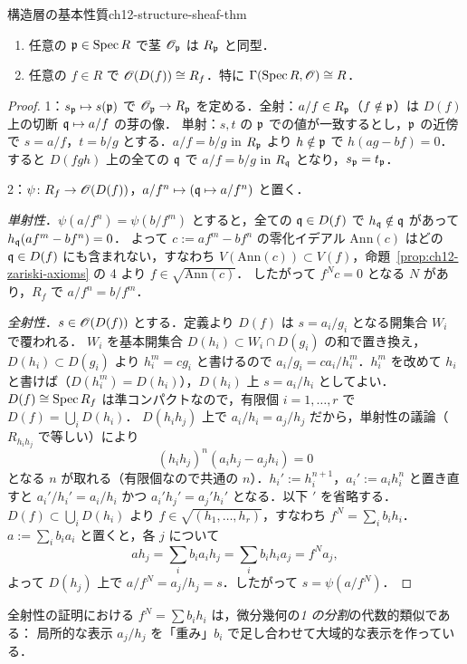 \begin{mythm}{構造層の基本性質}{ch12-structure-sheaf-thm}
\begin{enumerate}
  \item 任意の $\mathfrak{p}\in\operatorname{Spec} R$ で茎 $\mathscr{O}_{\mathfrak{p}}$ は $R_{\mathfrak{p}}$ と同型．
  \item 任意の $f\in R$ で $\mathscr{O}(D(f))\cong R_f$．特に $\Gamma(\operatorname{Spec} R,\mathscr{O})\cong R$．
\end{enumerate}
\end{mythm}
\begin{proof}
1：$s_{\mathfrak{p}}\mapsto s(\mathfrak{p})$ で $\mathscr{O}_{\mathfrak{p}}\to R_{\mathfrak{p}}$ を定める．全射：$a/f\in R_{\mathfrak{p}}$（$f\notin\mathfrak{p}$）は $D(f)$ 上の切断 $\mathfrak{q}\mapsto a/f$ の芽の像．
単射：$s,t$ の $\mathfrak{p}$ での値が一致するとし，$\mathfrak{p}$ の近傍で $s=a/f$，$t=b/g$ とする．$a/f=b/g$ in $R_{\mathfrak{p}}$ より $h\notin\mathfrak{p}$ で $h(ag-bf)=0$．
すると $D(fgh)$ 上の全ての $\mathfrak{q}$ で $a/f=b/g$ in $R_{\mathfrak{q}}$ となり，$s_{\mathfrak{p}}=t_{\mathfrak{p}}$．

2：$\psi\colon R_f\to\mathscr{O}(D(f))$，$a/f^n\mapsto(\mathfrak{q}\mapsto a/f^n)$ と置く．

\emph{単射性}．$\psi(a/f^n)=\psi(b/f^m)$ とすると，全ての $\mathfrak{q}\in D(f)$ で $h_{\mathfrak{q}}\notin\mathfrak{q}$ があって $h_{\mathfrak{q}}(af^m-bf^n)=0$．
よって $c:=af^m-bf^n$ の零化イデアル $\mathrm{Ann}(c)$ はどの $\mathfrak{q}\in D(f)$ にも含まれない，すなわち $V(\mathrm{Ann}(c))\subset V(f)$，命題~\ref{prop:ch12-zariski-axioms} の 4 より $f\in\sqrt{\mathrm{Ann}(c)}$．
したがって $f^Nc=0$ となる $N$ があり，$R_f$ で $a/f^n=b/f^m$．

\emph{全射性}．$s\in\mathscr{O}(D(f))$ とする．定義より $D(f)$ は $s=a_i/g_i$ となる開集合 $W_i$ で覆われる．
$W_i$ を基本開集合 $D(h_i)\subset W_i\cap D(g_i)$ の和で置き換え，$D(h_i)\subset D(g_i)$ より $h_i^m=cg_i$ と書けるので $a_i/g_i=ca_i/h_i^m$．$h_i^m$ を改めて $h_i$ と書けば（$D(h_i^m)=D(h_i)$），$D(h_i)$ 上 $s=a_i/h_i$ としてよい．
$D(f)\cong\operatorname{Spec} R_f$ は準コンパクトなので，有限個 $i=1,\dots,r$ で $D(f)=\bigcup_iD(h_i)$．
$D(h_ih_j)$ 上で $a_i/h_i=a_j/h_j$ だから，単射性の議論（$R_{h_ih_j}$ で等しい）により
\[
  (h_ih_j)^n(a_ih_j-a_jh_i)=0
\]
となる $n$ が取れる（有限個なので共通の $n$）．$h_i':=h_i^{n+1}$，$a_i':=a_ih_i^n$ と置き直すと $a_i'/h_i'=a_i/h_i$ かつ $a_i'h_j'=a_j'h_i'$ となる．以下 $'$ を省略する．
$D(f)\subset\bigcup_iD(h_i)$ より $f\in\sqrt{(h_1,\dots,h_r)}$，すなわち $f^N=\sum_ib_ih_i$．$a:=\sum_ib_ia_i$ と置くと，各 $j$ について
\[
  ah_j=\sum_ib_ia_ih_j=\sum_ib_ih_ia_j=f^Na_j,
\]
よって $D(h_j)$ 上で $a/f^N=a_j/h_j=s$．したがって $s=\psi(a/f^N)$．
\end{proof}

全射性の証明における $f^N=\sum b_ih_i$ は，微分幾何の\emph{1 の分割}の代数的類似である：
局所的な表示 $a_j/h_j$ を「重み」$b_i$ で足し合わせて大域的な表示を作っている．

